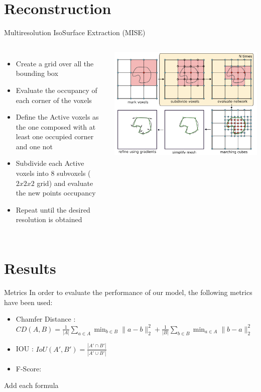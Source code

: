 \documentclass{beamer}
\begin{document}
\section{Reconstruction}

\begin{frame}{Multiresolution IsoSurface Extraction (MISE)}
    \begin{columns}[T]
        \begin{itemize}
            \item Create a grid over all the bounding box 
            \item Evaluate the occupancy of each corner of the voxels
            \item Define the Active voxels as the one composed with at least one occupied corner and one not 
            \item Subdivide each Active voxels into 8 subvoxels ($2x2x2$ grid) and evaluate the new points occupancy
            \item Repeat until the desired resolution is obtained
        \end{itemize}
        \includegraphics[width=\linewidth]{../Media/structure/mise.png}
    \end{columns}
  \end{frame}

\section{Results}

\begin{frame}{Metrics}
In order to evaluate the performance of our model, the following metrics have been used:
\begin{itemize}
\item Chamfer Distance : \\ 
$
CD(A, B) = \frac{1}{|A|} \sum_{a \in A} \min_{b \in B} \|a - b\|_2^2 + \frac{1}{|B|} \sum_{b \in B} \min_{a \in A} \|b - a\|_2^2
$
\item IOU : 
$ IoU(A', B') = \frac{|A' \cap B'|}{|A' \cup B'|}$
\item F-Score:
\end{itemize}
Add each formula
\end{frame}
\end{document}
